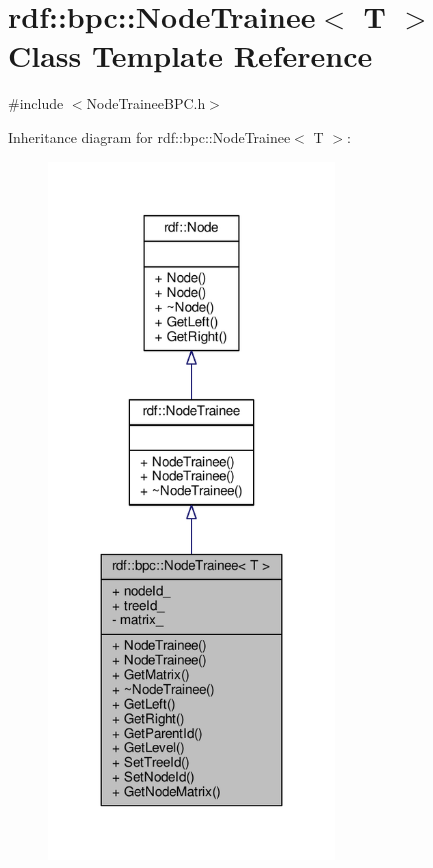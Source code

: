 \hypertarget{classrdf_1_1bpc_1_1NodeTrainee}{}\section{rdf\+:\+:bpc\+:\+:Node\+Trainee$<$ T $>$ Class Template Reference}
\label{classrdf_1_1bpc_1_1NodeTrainee}


{\ttfamily \#include $<$Node\+Trainee\+B\+P\+C.\+h$>$}



Inheritance diagram for rdf\+:\+:bpc\+:\+:Node\+Trainee$<$ T $>$\+:
\nopagebreak
\begin{figure}[H]
\begin{center}
\leavevmode
\includegraphics[width=215pt]{classrdf_1_1bpc_1_1NodeTrainee__inherit__graph}
\end{center}
\end{figure}


